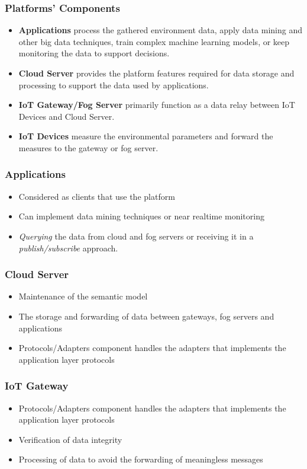 \documentclass{../iot-lecture}
\begin{document}
\begin{frame}
  \frametitle{Platforms' Components}
  \begin{itemize}
    \item \textbf{\color{Cyan} Applications} process the gathered environment data, apply data mining and other big data
      techniques, train complex machine learning models, or keep monitoring the data to support decisions.
    \item \textbf{\color{YellowOrange} Cloud Server} provides the platform features required for data storage and processing to support
      the data used by applications.
    \item \textbf{\color{LimeGreen} IoT Gateway/Fog Server} primarily function as a data relay between IoT Devices and Cloud Server.
    \item \textbf{\color{RubineRed} IoT Devices} measure the environmental parameters and forward the measures to the gateway or fog server.
  \end{itemize}
\end{frame}

\begin{frame}
  \frametitle{Applications}
  \begin{itemize}
    \item Considered as clients that use the platform
    \item Can implement data mining techniques or near realtime monitoring
    \item \textit{Querying} the data from cloud and fog servers or receiving it in a \textit{publish/subscribe} approach.
  \end{itemize}
\end{frame}

\begin{frame}
  \frametitle{Cloud Server}
  \begin{itemize}
    \item Maintenance of the semantic model
    \item The storage and forwarding of data between gateways, fog servers and applications
    \item Protocols/Adapters component handles the adapters that implements the application layer protocols
  \end{itemize}
\end{frame}

\begin{frame}
  \frametitle{IoT Gateway}
  \begin{itemize}
    \item Protocols/Adapters component handles the adapters that implements the application layer protocols
    \item Verification of data integrity
    \item Processing of data to avoid the forwarding of meaningless messages
  \end{itemize}
\end{frame}
\end{document}
